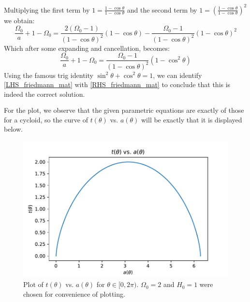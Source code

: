 Multiplying the first term by $1 = \frac{1 - \cos\theta}{1-\cos\theta}$ and the second term by $1 = \left(\frac{1 - \cos\theta}{1-\cos\theta}\right)^2$ we obtain:
\begin{equation}
    \frac{\Omega_0}{a} + 1 - \Omega_0 = \frac{2(\Omega_0 - 1)}{(1 -\cos\theta)^2}(1 - \cos\theta) - \frac{\Omega_0 - 1}{(1 - \cos\theta)^2}(1 - \cos\theta)^2
\end{equation}
Which after some expanding and cancellation, becomes:
\begin{equation}\label{RHS_friedmann_mat}
    \frac{\Omega_0}{a} + 1 - \Omega_0 = \frac{\Omega_0 - 1}{(1 - \cos\theta)^2}(1 -\cos^2\theta)
\end{equation}
Using the famous trig identity $\sin^2\theta + \cos^2\theta = 1$, we can identify \eqref{LHS_friedmann_mat} with \eqref{RHS_friedmann_mat} to conclude that this is indeed the correct solution.

For the plot, we observe that the given parametric equations are exactly of those for a cycloid, so the curve of $t(\theta)$ vs. $a(\theta)$ will be exactly that it is displayed below.

\begin{figure}[htbp]
    \centering
    \includegraphics[scale=0.7]{Images/Q5-A.pdf}
    \caption{Plot of $t(\theta)$ vs. $a(\theta)$ for $\theta \in [0, 2\pi)$. $\Omega_0 = 2$ and $H_0 = 1$ were chosen for convenience of plotting.}
    \label{plotatcycloid}
\end{figure}